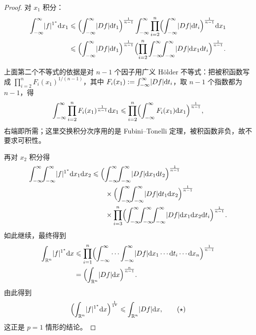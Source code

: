 \documentclass[../../main.tex]{subfiles}%
\begin{document}
\begin{proof}
对 $x_1$ 积分：
\begin{align*}
\int_{-\infty}^{\infty}\lvert f\rvert^{1^*}\mathrm{d} x_1
&\leqslant\Bigl(\int_{-\infty}^{\infty}\lvert Df\rvert\mathrm{d} t_1\Bigr)^{\frac{1}{n-1}}\int_{-\infty}^{\infty}\prod_{i=2}^{n}\Bigl(\int_{-\infty}^{\infty}\lvert Df\rvert\mathrm{d} t_i\Bigr)^{\frac{1}{n-1}}\mathrm{d} x_1\\
&\leqslant\Bigl(\int_{-\infty}^{\infty}\lvert Df\rvert\mathrm{d} t_1\Bigr)^{\frac{1}{n-1}}\Bigl(\prod_{i=2}^{n}\int_{-\infty}^{\infty}\!\!\int_{-\infty}^{\infty}\lvert Df\rvert\mathrm{d} x_1\mathrm{d} t_i\Bigr)^{\frac{1}{n-1}}.
\end{align*}

上面第二个不等式的依据是对 $n-1$ 个因子用广义 Hölder 不等式：把被积函数写成 $\prod_{i=2}^{n}F_i(x_1)^{1/(n-1)}$，其中 $F_i(x_1):=\int_{-\infty}^{\infty}\lvert Df\rvert\mathrm{d} t_i$，取 $n-1$ 个指数都为 $n-1$，得
\begin{align*}
\int_{-\infty}^{\infty}\prod_{i=2}^{n}F_i(x_1)^{\frac{1}{n-1}}\mathrm{d} x_1\leqslant\prod_{i=2}^{n}\Bigl(\int_{-\infty}^{\infty}F_i(x_1)\mathrm{d} x_1\Bigr)^{\frac{1}{n-1}},
\end{align*}
右端即所需；这里交换积分次序用的是 Fubini--Tonelli 定理，被积函数非负，故不要求可积性。

再对 $x_2$ 积分得
\begin{align*}
\int_{-\infty}^{\infty}\!\!\int_{-\infty}^{\infty}\lvert f\rvert^{1^*}\diff x_1\diff x_2
&\leqslant\Bigl(\int_{-\infty}^{\infty}\!\!\int_{-\infty}^{\infty}\lvert Df\rvert\diff x_1\diff t_2\Bigr)^{\frac{1}{n-1}}\\
&\qquad\times\Bigl(\int_{-\infty}^{\infty}\!\!\int_{-\infty}^{\infty}\lvert Df\rvert\diff t_1\diff x_2\Bigr)^{\frac{1}{n-1}}\\
&\qquad\times\prod_{i=3}^{n}\Bigl(\int_{-\infty}^{\infty}\!\!\int_{-\infty}^{\infty}\!\!\int_{-\infty}^{\infty}\lvert Df\rvert\diff x_1\diff x_2\diff t_i\Bigr)^{\frac{1}{n-1}}.
\end{align*}
如此继续，最终得到
\begin{align*}
\int_{\mathbb{R}^n}\lvert f\rvert^{1^*}\mathrm{d} x
&\leqslant\prod_{i=1}^{n}\Bigl(\int_{-\infty}^{\infty}\cdots\int_{-\infty}^{\infty}\lvert Df\rvert\mathrm{d} x_1\cdots\mathrm{d} t_i\cdots\mathrm{d} x_n\Bigr)^{\frac{1}{n-1}}\\
&=\Bigl(\int_{\mathbb{R}^n}\lvert Df\rvert\mathrm{d} x\Bigr)^{\frac{n}{n-1}}.
\end{align*}
由此得到
\begin{align*}
\Bigl(\int_{\mathbb{R}^n}\lvert f\rvert^{1^*}\mathrm{d} x\Bigr)^{\frac{1}{1^*}}\leqslant\int_{\mathbb{R}^n}\lvert Df\rvert\mathrm{d} x,\qquad(\star)
\end{align*}
这正是 $p=1$ 情形的结论。


\end{proof}
\end{document}
